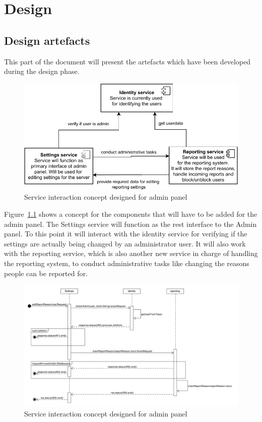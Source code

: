 

\chapter{Design}\label{ch:design}


\section{Design artefacts}\label{sec:design-artefacts}

This part of the document will present the artefacts which have been developed during the design phase.

\begin{figure}[h]
    \centering
    \includegraphics[width=1.0\textwidth]{./graphics/component_interaction}
    \caption{Service interaction concept designed for admin panel}
    \label{fig:componentInteraction}
\end{figure}

Figure~\ref{fig:componentInteraction} shows a concept for the components that will have to be added for the admin panel.
The Settings service will function as the rest interface to the Admin panel.
To this point it will interact with the identity service for verifying if the settings are actually being changed by an
administrator user.
It will also work with the reporting service, which is also another new service in charge of handling the reporting
system, to conduct administrative tasks like changing the reasons people can be reported for.

\begin{figure}[h]
    \centering
    \includegraphics[width=1.0\textwidth]{./graphics/SequenceDiagram_AddReportReason}
    \caption{Service interaction concept designed for admin panel}
    \label{fig:sequenceDiagramAddReportReason}
\end{figure}

